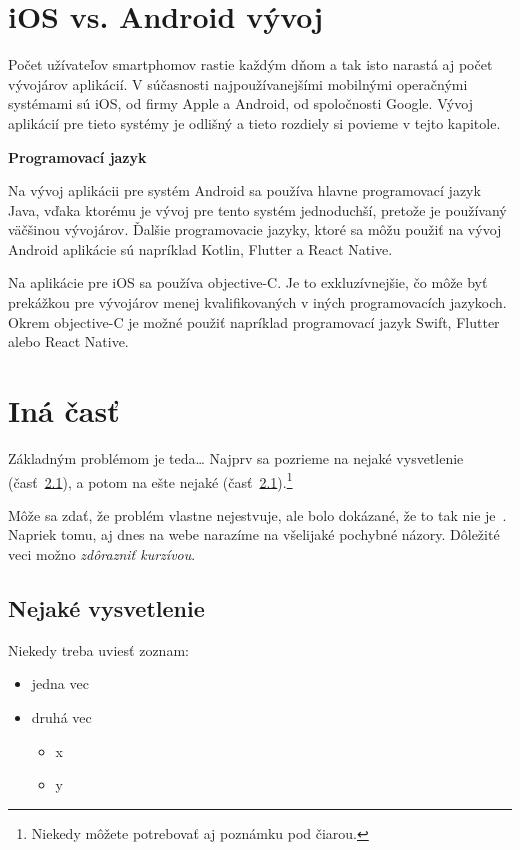 \documentclass[10pt,twoside,slovak,a4paper]{article}
\begin{document}
\section{iOS vs. Android vývoj}
\quad 	Počet užívateľov smartphomov rastie každým dňom a tak isto narastá aj počet vývojárov aplikácií. V súčasnosti najpoužívanejšími mobilnými operačnými systémami sú iOS, od firmy Apple a Android, od spoločnosti Google. Vývoj aplikácií pre tieto systémy je odlišný a tieto rozdiely si povieme v tejto kapitole.

\textbf{Programovací jazyk}

Na vývoj aplikácii pre systém Android sa používa hlavne programovací jazyk Java, vďaka ktorému je vývoj pre tento systém jednoduchší, pretože je používaný väčšinou vývojárov. Ďalšie programovacie jazyky, ktoré sa môžu použiť na vývoj Android aplikácie sú napríklad Kotlin, Flutter a React Native.

Na aplikácie pre iOS sa používa objective-C. Je to exkluzívnejšie, čo môže byť prekážkou pre vývojárov menej kvalifikovaných v iných programovacích jazykoch. Okrem objective-C je možné použiť napríklad programovací jazyk Swift, Flutter alebo React Native.




\section{Iná časť} \label{ina}

Základným problémom je teda\ldots{} Najprv sa pozrieme na nejaké vysvetlenie (časť~\ref{ina:nejake}), a potom na ešte nejaké (časť~\ref{ina:nejake}).\footnote{Niekedy môžete potrebovať aj poznámku pod čiarou.}

Môže sa zdať, že problém vlastne nejestvuje\cite{Coplien:MPD}, ale bolo dokázané, že to tak nie je~\cite{Czarnecki:Staged, Czarnecki:Progress}. Napriek tomu, aj dnes na webe narazíme na všelijaké pochybné názory\cite{PLP-Framework}. Dôležité veci možno \emph{zdôrazniť kurzívou}.


\subsection{Nejaké vysvetlenie} \label{ina:nejake}

Niekedy treba uviesť zoznam:

\begin{itemize}
\item jedna vec
\item druhá vec
	\begin{itemize}
	\item x
	\item y
	\end{itemize}
\end{itemize}
\end{document}
